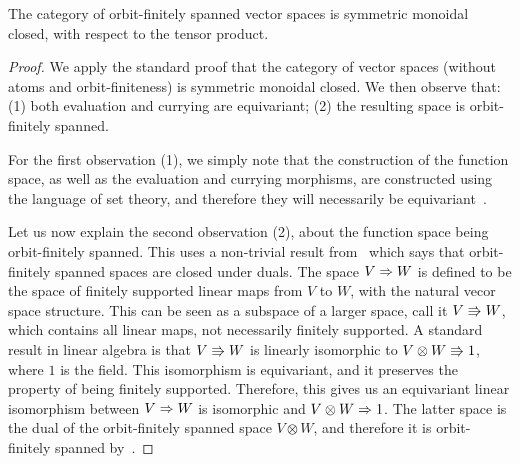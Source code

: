 \begin{theorem}\label{thm:orbit-finite-vector-space-closed} The category of orbit-finitely spanned vector spaces is symmetric monoidal closed, with respect to the tensor product.
\end{theorem}
\begin{proof} We apply the standard proof that the category of vector spaces (without atoms and orbit-finiteness) is symmetric monoidal closed. We then observe that: (1) both evaluation and currying are equivariant; (2) the resulting space is orbit-finitely spanned. 
    
    For the first observation (1), we simply note that the construction of the function space, as well as  the evaluation and currying morphisms, are constructed using the language of set theory, and therefore they will necessarily be equivariant~\cite[Equivariance Principle]{bojanczyk_slightly2018}.

    Let us now explain the second observation (2), about the function space being orbit-finitely spanned. This uses a non-trivial result from~\cite{bojanczykKM21OrbitFiniteVector} which says that orbit-finitely spanned spaces are closed under duals. 
    The space $V \Rightarrow W$ is defined to be the space of finitely supported linear maps from $V$ to $W$, with the natural vecor space structure. This can be seen as a subspace of a larger space, call it $V \Rrightarrow W$, which contains all linear maps, not necessarily finitely supported. A standard result in linear algebra is that $V \Rrightarrow W$ is linearly isomorphic to $ V \otimes W \Rrightarrow 1$, where $1$ is the field. This isomorphism is equivariant, and it preserves the property of being finitely supported. Therefore, this gives us an equivariant linear isomorphism between $V \Rightarrow W$ is isomorphic and $ V \otimes W \Rightarrow 1$. The latter space is the dual of the orbit-finitely spanned space $V \otimes W$, and therefore it is orbit-finitely spanned by~\cite[Corollary VI.5]{bojanczykKM21OrbitFiniteVector}.
\end{proof}

